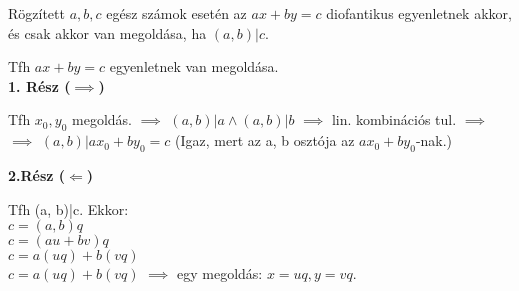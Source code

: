 \begin{frame}
  \begin{tcolorbox}[title={Tétel: A diofantikus egyenlet megoldása}]
    Rögzített $a, b, c$ egész számok esetén az \textbf{$ax + by = c$} diofantikus egyenletnek akkor, és csak akkor van megoldása, ha $(a, b)|c$.
  \end{tcolorbox}

  \begin{tcolorbox}[title={Bizonyítás}]
    Tfh $ax + by = c$ egyenletnek van megoldása.\\
    \textbf{1. Rész ($\implies$)}\\
    \smallskip

    Tfh $x_0, y_0$ megoldás. $\implies$ $(a, b)|a \land (a, b)|b$ $\implies$ lin. kombinációs tul. $\implies$\\
    $\implies$ $(a, b)|ax_0 + by_0 = c$ (Igaz, mert az a, b osztója az $ax_0 + by_0$-nak.)\\
    \bigskip

    \textbf{2.Rész ($\Longleftarrow$)}\\
    \smallskip

    Tfh (a, b)|c. Ekkor:\\
    $c = (a, b)q$\\
    $c = (au + bv)q$\\
    $c = a(uq) + b(vq)$\\
    $c = a(uq) + b(vq)$ $\implies$ egy megoldás: $x = uq, y = vq$.\\
  \end{tcolorbox}
\end{frame}

